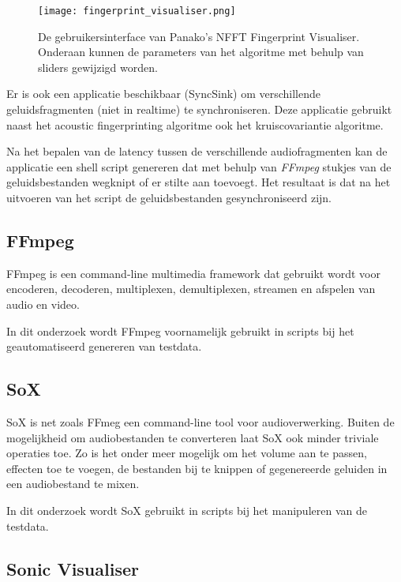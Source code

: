 \begin{figure}[!h]
	\captionsetup{width=0.6\textwidth}
	\caption[Gebruikersinterface van Audacity]{De gebruikersinterface van Panako's NFFT Fingerprint Visualiser. Onderaan kunnen de parameters van het algoritme met behulp van sliders gewijzigd worden.}
	\centering
	\advance\parskip0.3cm
	\texttt{[image: fingerprint\_visualiser.png]}
	\label{fingerprint_visualiser}
\end{figure}

Er is ook een applicatie beschikbaar (SyncSink) om verschillende geluidsfragmenten (niet in realtime) te synchroniseren. Deze applicatie gebruikt naast het acoustic fingerprinting algoritme ook het kruiscovariantie algoritme. 

Na het bepalen van de latency tussen de verschillende audiofragmenten kan de applicatie een shell script genereren dat met behulp van \textit{FFmpeg} stukjes van de geluidsbestanden wegknipt of er stilte aan toevoegt. Het resultaat is dat na het uitvoeren van het script de geluidsbestanden gesynchroniseerd zijn.

\subsection{FFmpeg}

FFmpeg is een command-line multimedia framework dat gebruikt wordt voor encoderen, decoderen, multiplexen, demultiplexen, streamen en afspelen van audio en video. \cite{kollarconfiguration}

In dit onderzoek wordt FFmpeg voornamelijk gebruikt in scripts bij het geautomatiseerd genereren van testdata.

\subsection{SoX}

SoX is net zoals FFmeg een command-line tool voor audioverwerking. Buiten de mogelijkheid om audiobestanden te converteren laat SoX ook minder triviale operaties toe. Zo is het onder meer mogelijk om het volume aan te passen, effecten toe te voegen, de bestanden bij te knippen of gegenereerde geluiden in een audiobestand te mixen.
\cite{barras2012sox}

In dit onderzoek wordt SoX gebruikt in scripts bij het manipuleren van de testdata.

\subsection{Sonic Visualiser}

